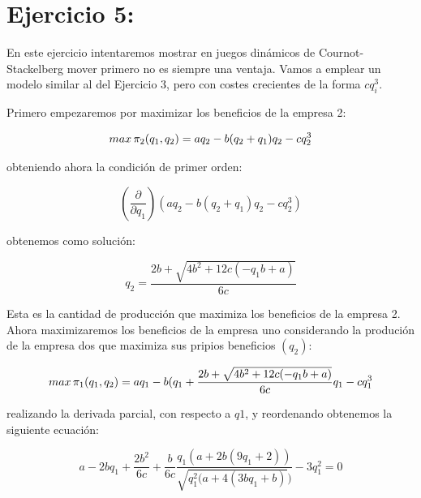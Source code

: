 \documentclass{article}
\begin{document}
\section{Ejercicio 5:}

En este ejercicio intentaremos mostrar en juegos dinámicos de Cournot-Stackelberg mover primero no es siempre una ventaja. Vamos a emplear un modelo similar al del Ejercicio 3, pero con costes crecientes de la forma $cq_i^3$.

\vspace{5mm}

Primero empezaremos por maximizar los beneficios de la empresa 2:

$$max\thinspace \pi_2(q_1,q_2)=aq_2-b(q_2+q_1)q_2-cq^3_2$$

obteniendo ahora la condici\'on de primer orden:

$$(\frac{\partial}{\partial q_1})(aq_2-b(q_2+q_1)q_2-cq^3_2)$$

obtenemos como soluci\'on:

$$q_2=\frac{2b+\sqrt{4b^2+12c(-q_1b+a)}}{6c}$$

Esta es la cantidad de producci\'on que maximiza los beneficios de la empresa 2. Ahora maximizaremos los beneficios de la empresa uno considerando la produci\'on de la empresa dos que maximiza sus pripios beneficios $(q_2)$:

$$max\thinspace \pi_1(q_1,q_2)=aq_1-b(q_1+\frac{2b+\sqrt{4b^2+12c(-q_1b+a)}}{6c}q_1-cq^3_1$$

realizando la derivada parcial, con respecto a $q1$, y reordenando obtenemos la siguiente ecuación:

$$a-2bq_1+\frac{2b^2}{6c}+\frac{b}{6c}\frac{q_1(a+2b(9q_1+2))}{\sqrt{q_1^2(a+4(3bq_1+b)})}-3q_1^2=0$$
\end{document}
